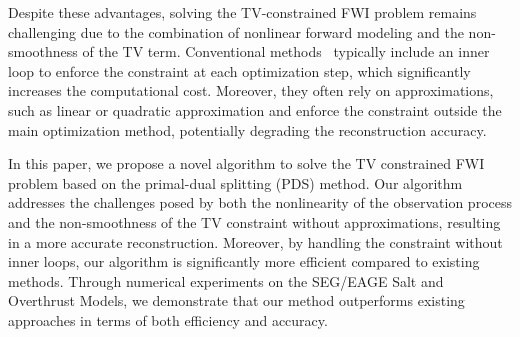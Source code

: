 Despite these advantages, solving the TV-constrained FWI problem remains challenging due to the combination of nonlinear forward modeling and the non-smoothness of the TV term.
Conventional methods~\cite{FWI-with-TV-constraint,FWI-with-TV-constraint2,FWI-with-TV-constraint3,FWI-with-TV-constraint4} typically include an inner loop to enforce the constraint at each optimization step, which significantly increases the computational cost.
Moreover, they often rely on approximations, such as linear or quadratic approximation and enforce the constraint outside the main optimization method, potentially degrading the reconstruction accuracy.

In this paper, we propose a novel algorithm to solve the TV constrained FWI problem based on the primal-dual splitting (PDS) method.
Our algorithm addresses the challenges posed by both the nonlinearity of the observation process and the non-smoothness of the TV constraint without approximations, resulting in a more accurate reconstruction.
Moreover, by handling the constraint without inner loops, our algorithm is significantly more efficient compared to existing methods.
Through numerical experiments on the SEG/EAGE Salt and Overthrust Models, we demonstrate that our method outperforms existing approaches in terms of both efficiency and accuracy.
